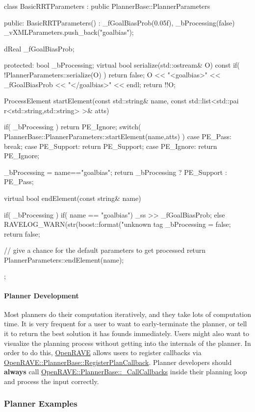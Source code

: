 \begin{DoxyCode}
class BasicRRTParameters : public PlannerBase::PlannerParameters
{
public:
BasicRRTParameters() : _fGoalBiasProb(0.05f), _bProcessing(false) {
        _vXMLParameters.push_back("goalbias");
    }
    
    dReal _fGoalBiasProb; 

 protected:
    bool _bProcessing;
    virtual bool serialize(std::ostream& O) const
    {
        if( !PlannerParameters::serialize(O) )
            return false;
        O << "<goalbias>" << _fGoalBiasProb << "</goalbias>" << endl;
        return !!O;
    }

    ProcessElement startElement(const std::string& name, const std::list<std::pai
      r<std::string,std::string> >& atts)
    {
        if( _bProcessing )
            return PE_Ignore;
        switch( PlannerBase::PlannerParameters::startElement(name,atts) ) {
            case PE_Pass: break;
            case PE_Support: return PE_Support;
            case PE_Ignore: return PE_Ignore;
        }
        
        _bProcessing = name=="goalbias";
        return _bProcessing ? PE_Support : PE_Pass;
    }
    
    virtual bool endElement(const string& name)
    {
        if( _bProcessing ) {
            if( name == "goalbias")
                _ss >> _fGoalBiasProb;
            else
                RAVELOG_WARN(str(boost::format("unknown tag %
            _bProcessing = false;
            return false;
        }

        // give a chance for the default parameters to get processed
        return PlannerParameters::endElement(name);
    }
};
\end{DoxyCode}
\hypertarget{arch__planner_planner_development}{}\paragraph{Planner Development}\label{arch__planner_planner_development}
Most planners do their computation iteratively, and they take lots of computation time. It is very frequent for a user to want to early-\/terminate the planner, or tell it to return the best solution it has founds immediately. Users might also want to visualize the planning process without getting into the internals of the planner. In order to do this, \hyperlink{namespaceOpenRAVE}{OpenRAVE} allows users to register callbacks via \hyperlink{classOpenRAVE_1_1PlannerBase_a7b72116e4770d98f2a78297246a679e8}{OpenRAVE::PlannerBase::RegisterPlanCallback}. Planner developers should {\bfseries always} call \hyperlink{classOpenRAVE_1_1PlannerBase_a4b980a3cc0e8fc7abd2d0afe472ef695}{OpenRAVE::PlannerBase::\_\-CallCallbacks} inside their planning loop and process the input correctly.\hypertarget{arch__planner_planner_examples}{}\subsubsection{Planner Examples}\label{arch__planner_planner_examples}
